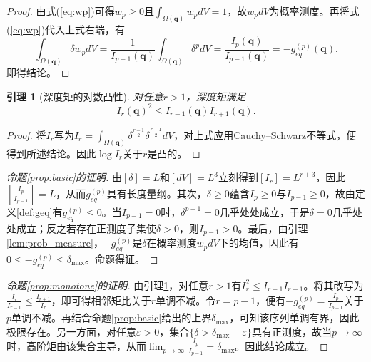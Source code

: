 ﻿\documentclass[12pt, a4paper]{ctexart}
\theoremstyle{plain}
\newtheorem{lemma}{引理}
\theoremstyle{remark}
\begin{document}
\begin{proof}
由式(\ref{eq:wp})可得$w_p \ge 0$且$\int_{\Omega(\bm{q})} w_p dV = 1$，故$w_p dV$为概率测度。再将式(\ref{eq:wp})代入上式右端，有
\begin{equation}
    \int_{\Omega(\bm{q})} \delta w_p dV = \frac{1}{I_{p-1}(\bm{q})} \int_{\Omega(\bm{q})} \delta^p dV = \frac{I_p(\bm{q})}{I_{p-1}(\bm{q})} = -g_{eq}^{(p)}(\bm{q}).
\end{equation}
即得结论。
\end{proof}

\begin{lemma}[深度矩的对数凸性]\label{lem:logconvex}
对任意$r > 1$，深度矩满足
\begin{equation}
    I_r(\bm{q})^2 \le I_{r-1}(\bm{q}) I_{r+1}(\bm{q}).
\end{equation}
\end{lemma}

\begin{proof}
将$I_r$写为$ I_r = \int_{\Omega(\bm{q})} \delta^{\frac{r-1}{2}} \delta^{\frac{r+1}{2}} dV$，对上式应用Cauchy--Schwarz不等式，便得到所述结论。因此$\log I_r$关于$r$是凸的。
\end{proof}

\begin{proof}[命题\ref{prop:basic}的证明]
由$[\delta] = L$和$[dV] = L^3$立刻得到$[I_r] = L^{r+3}$，因此$ \left[ \frac{I_p}{I_{p-1}} \right] = L $，从而$g_{eq}^{(p)}$具有长度量纲。其次，$\delta \ge 0$蕴含$I_p \ge 0$与$I_{p-1} \ge 0$，故由定义\ref{def:geq}有$g_{eq}^{(p)} \le 0$。当$I_{p-1} = 0$时，$\delta^{p-1} = 0$几乎处处成立，于是$\delta = 0$几乎处处成立；反之若存在正测度子集使$\delta > 0$，则$I_{p-1} > 0$。最后，由引理\ref{lem:prob_measure}，$-g_{eq}^{(p)}$是$\delta$在概率测度$w_p dV$下的均值，因此有$ 0 \le -g_{eq}^{(p)} \le \delta_{\max}$。命题得证。
\end{proof}

\begin{proof}[命题\ref{prop:monotone}的证明]
由引理\ref{lem:logconvex}，对任意$r > 1$有$I_r^2 \le I_{r-1} I_{r+1}$。将其改写为$ \frac{I_r}{I_{r-1}} \le \frac{I_{r+1}}{I_r} $，即可得相邻矩比关于$r$单调不减。令$r = p-1$，便有$ -g_{eq}^{(p)} = \frac{I_p}{I_{p-1}} $关于$p$单调不减。再结合命题\ref{prop:basic}给出的上界$\delta_{\max}$，可知该序列单调有界，因此极限存在。另一方面，对任意$\varepsilon > 0$，集合$\{ \delta > \delta_{\max} - \varepsilon \}$具有正测度，故当$p \to \infty$时，高阶矩由该集合主导，从而$ \lim_{p \to \infty} \frac{I_p}{I_{p-1}} = \delta_{\max} $。因此结论成立。
\end{proof}
\end{document}
